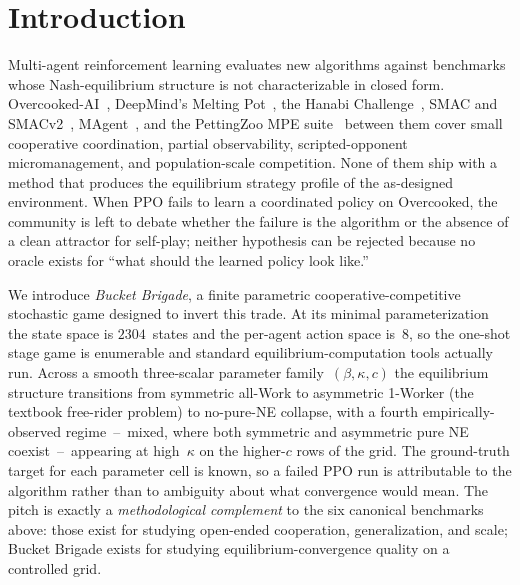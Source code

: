 \documentclass{anvil-paper}
\begin{document}
\section{Introduction}
\label{sec:intro}

Multi-agent reinforcement learning evaluates new algorithms against benchmarks
whose Nash-equilibrium structure is not characterizable in closed form.
Overcooked-AI~\citep{overcooked2019}, DeepMind's Melting
Pot~\citep{meltingpot2021}, the Hanabi
Challenge~\citep{hanabi2020}, SMAC and SMACv2~\citep{smac2019,smacv2_2023},
MAgent~\citep{magent2018}, and the PettingZoo MPE
suite~\citep{pettingzoo2021} between them cover small cooperative
coordination, partial observability, scripted-opponent micromanagement, and
population-scale competition. None of them ship with a method that produces
the equilibrium strategy profile of the as-designed environment. When PPO
fails to learn a coordinated policy on Overcooked, the community is left to
debate whether the failure is the algorithm or the absence of a clean
attractor for self-play; neither hypothesis can be rejected because no oracle
exists for ``what should the learned policy look like.''

We introduce \emph{Bucket Brigade}, a finite parametric cooperative-competitive
stochastic game designed to invert this trade. At its minimal parameterization
the state space is $2304$~states and the per-agent action space is~$8$, so the
one-shot stage game is enumerable and standard equilibrium-computation tools
actually run. Across a smooth three-scalar parameter family~$(\beta,\kappa,c)$
the equilibrium structure transitions from symmetric all-Work to asymmetric
1-Worker (the textbook free-rider problem) to no-pure-NE collapse, with a
fourth empirically-observed regime~--~\textsf{mixed}, where both symmetric
and asymmetric pure NE coexist~--~appearing at high~$\kappa$ on the
higher-$c$ rows of the grid. The ground-truth target for each parameter cell
is known, so a failed PPO run is attributable to the algorithm rather than
to ambiguity about what convergence would mean. The pitch is exactly a
\emph{methodological complement} to the six canonical benchmarks above: those
exist for studying open-ended cooperation, generalization, and scale; Bucket
Brigade exists for studying equilibrium-convergence quality on a controlled
grid.
\end{document}
